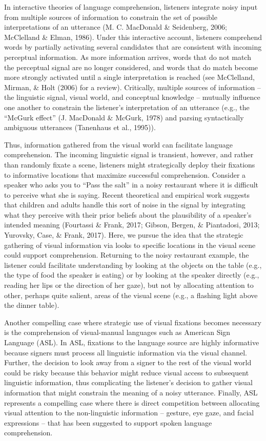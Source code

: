 \documentclass[oneside]{report}
\begin{document}
In interactive theories of language comprehension, listeners integrate
noisy input from multiple sources of information to constrain the set of
possible interpretations of an utterance (M. C. MacDonald \& Seidenberg,
2006; McClelland \& Elman, 1986). Under this interactive account,
listeners comprehend words by partially activating several candidates
that are consistent with incoming perceptual information. As more
information arrives, words that do not match the perceptual signal are
no longer considered, and words that do match become more strongly
activated until a single interpretation is reached (see McClelland,
Mirman, \& Holt (2006) for a review). Critically, multiple sources of
information -- the linguistic signal, visual world, and conceptual
knowledge -- mutually influence one another to constrain the listener's
interpretation of an utterance (e.g., the ``McGurk effect'' (J.
MacDonald \& McGurk, 1978) and parsing syntactically ambiguous
utterances (Tanenhaus et al., 1995)).

Thus, information gathered from the visual world can facilitate language
comprehension. The incoming linguistic signal is transient, however, and
rather than randomly fixate a scene, listeners might strategically
deploy their fixations to informative locations that maximize successful
comprehension. Consider a speaker who asks you to ``Pass the salt'' in a
noisy restaurant where it is difficult to perceive what she is saying.
Recent theoretical and empirical work suggests that children and adults
handle this sort of noise in the signal by integrating what they
perceive with their prior beliefs about the plausibility of a speaker's
intended meaning (Fourtassi \& Frank, 2017; Gibson, Bergen, \&
Piantadosi, 2013; Yurovsky, Case, \& Frank, 2017). Here, we pursue the
idea that the strategic gathering of visual information via looks to
specific locations in the visual scene could support comprehension.
Returning to the noisy restaurant example, the listener could facilitate
understanding by looking at the objects on the table (e.g., the type of
food the speaker is eating) or by looking at the speaker directly (e.g.,
reading her lips or the direction of her gaze), but not by allocating
attention to other, perhaps quite salient, areas of the visual scene
(e.g., a flashing light above the dinner table).

Another compelling case where strategic use of visual fixations becomes
necessary is the comprehension of visual-manual languages such as
American Sign Language (ASL). In ASL, fixations to the language source
are highly informative because signers must process all linguistic
information via the visual channel. Further, the decision to look away
from a signer to the rest of the visual world could be risky because
this behavior might reduce visual access to subsequent linguistic
information, thus complicating the listener's decision to gather visual
information that might constrain the meaning of a noisy utterance.
Finally, ASL represents a compelling case where there is direct
competition between allocating visual attention to the non-linguistic
information -- gesture, eye gaze, and facial expressions -- that has
been suggested to support spoken language comprehension.
\end{document}
